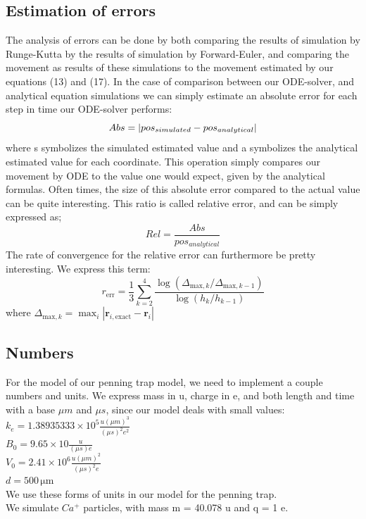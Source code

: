 \documentclass[english,notitlepage,reprint,nofootinbib,twocolumn]{article}
\begin{document}
\subsection{Estimation of errors}
The analysis of errors can be done by both comparing the results of simulation by Runge-Kutta by the results of simulation by Forward-Euler, and comparing the movement as results of these simulations to the movement estimated by our equations (13) and (17). In the case of comparison between our ODE-solver, and analytical equation simulations we can simply estimate an absolute error for each step in time our ODE-solver performs: 
\begin{equation}
    Abs=\abs{pos_{simulated}-pos_{analytical}} 
\end{equation}
where s symbolizes the simulated estimated value and a symbolizes the analytical estimated value for each coordinate. This operation simply compares our movement by ODE to the value one would expect, given by the analytical formulas. Often times, the size of this absolute error compared to the actual value can be quite interesting. This ratio is called relative error, and can be simply expressed as; 
\begin{equation}
    Rel=\frac{Abs}{pos_{analytical}}
\end{equation}
The rate of convergence for the relative error can furthermore be pretty interesting. We express this term: 
\begin{equation}
    r_{\text{err}} = \frac{1}{3}\sum_{k=2}^4\frac{\log (\Delta_{\text{max},k}/\Delta_{\text{max},k-1})}{\log (h_{k}/h_{k-1}) }
\end{equation}
where $\Delta_{\text{max},k} = \max_i |\mathbf{r}_{i, \text{exact}} - \mathbf{r}_{i}|$


\subsection{Numbers}
For the model of our penning trap model, we need to implement a couple numbers and units. We express mass in u, charge in e, and both length and time with a base $\mu m$ and $\mu s$, since our model deals with small values: \\
$k_e = 1.38935333 \times 10^5 \frac{u (\mu m)^3}{(\mu s)^2e^2}$\\
$B_0 =  9.65 \times 10 \frac{u}{(\mu s)e}$ \\
$V_0 = 2.41 \times 10^6 \frac{u (\mu m)^2}{(\mu s)^2e}$ \\
$d = 500\,\mathrm{\mu m}$ \\
We use these forms of units in our model for the penning trap. \\
We simulate $Ca^+$ particles, with mass m = 40.078 u and q = 1 e. 
\end{document}
